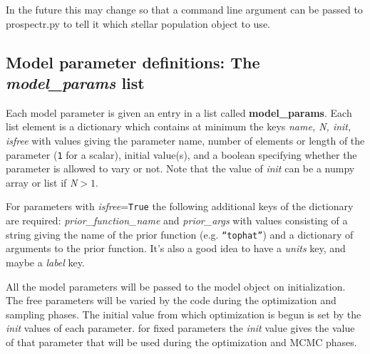 In the future this may change so that a command line argument can be
passed to prospectr.py to tell it which stellar population object to use.

\subsection{Model parameter definitions: The \emph{model_params} list}
Each model parameter is given an entry in a list called {\bf
model_params}. Each list element is a dictionary which contains at
minimum the keys {\it name, N, init, isfree} with values giving the
parameter name, number of elements or length of the parameter
(\texttt{1} for a scalar), initial value(s), and a boolean specifying
whether the parameter is allowed to vary or not.  Note that the value
of {\it init} can be a numpy array or list if {\it N}$>1$.

For parameters with {\it isfree}=\texttt{True} the following
additional keys of the dictionary are required: {\it
prior_function_name} and {\it prior_args} with values consisting of a
string giving the name of the prior function
(e.g. \texttt{``tophat''}) and a dictionary of arguments to the prior
function. It's also a good idea to have a {\it units} key, and maybe a
{\it label} key.

All the model parameters will be passed to the model object on
initialization.  The free parameters will be varied by the code during
the optimization and sampling phases.  The initial value from which
optimization is begun is set by the {\it init} values of each
parameter.  for fixed parameters the {\it init} value gives the value
of that parameter that will be used during the optimization and MCMC
phases.

